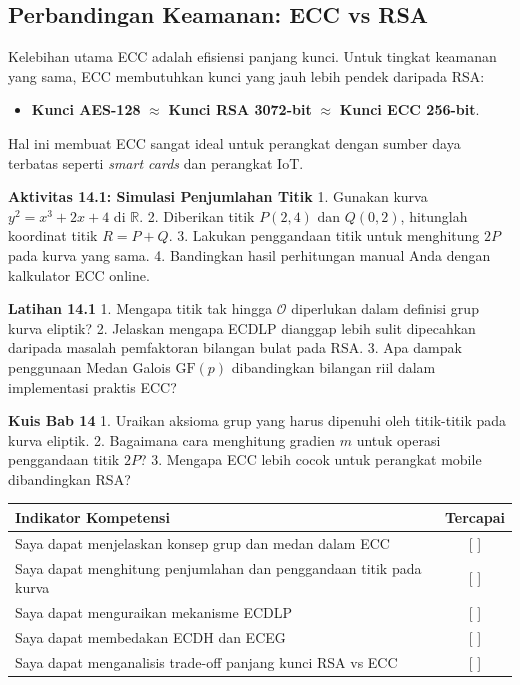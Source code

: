 \documentclass[../main.tex]{subfiles}
\begin{document}
\subsection{Perbandingan Keamanan: ECC vs RSA}
Kelebihan utama ECC adalah efisiensi panjang kunci. Untuk tingkat keamanan yang sama, ECC membutuhkan kunci yang jauh lebih pendek daripada RSA:
\begin{itemize}
    \item \textbf{Kunci AES-128} $\approx$ \textbf{Kunci RSA 3072-bit} $\approx$ \textbf{Kunci ECC 256-bit}.
\end{itemize}
Hal ini membuat ECC sangat ideal untuk perangkat dengan sumber daya terbatas seperti \textit{smart cards} dan perangkat IoT.

\begin{obeactivity}
\textbf{Aktivitas 14.1: Simulasi Penjumlahan Titik}
1. Gunakan kurva $y^2 = x^3 + 2x + 4$ di $\mathbb{R}$.
2. Diberikan titik $P(2, 4)$ dan $Q(0, 2)$, hitunglah koordinat titik $R = P + Q$.
3. Lakukan penggandaan titik untuk menghitung $2P$ pada kurva yang sama.
4. Bandingkan hasil perhitungan manual Anda dengan kalkulator ECC online.
\end{obeactivity}

\begin{obereflection}
\textbf{Latihan 14.1}
1. Mengapa titik tak hingga $\mathcal{O}$ diperlukan dalam definisi grup kurva eliptik?
2. Jelaskan mengapa ECDLP dianggap lebih sulit dipecahkan daripada masalah pemfaktoran bilangan bulat pada RSA.
3. Apa dampak penggunaan Medan Galois $\text{GF}(p)$ dibandingkan bilangan riil dalam implementasi praktis ECC?
\end{obereflection}

\begin{obeassessment}
\textbf{Kuis Bab 14}
1. Uraikan aksioma grup yang harus dipenuhi oleh titik-titik pada kurva eliptik.
2. Bagaimana cara menghitung gradien $m$ untuk operasi penggandaan titik $2P$?
3. Mengapa ECC lebih cocok untuk perangkat mobile dibandingkan RSA?
\end{obeassessment}

\begin{competencychecklist}
\begin{tabularx}{\linewidth}{|X|c|}
\hline
Indikator Kompetensi & Tercapai \\
\hline
Saya dapat menjelaskan konsep grup dan medan dalam ECC & [ ] \\
\hline
Saya dapat menghitung penjumlahan dan penggandaan titik pada kurva & [ ] \\
\hline
Saya dapat menguraikan mekanisme ECDLP & [ ] \\
\hline
Saya dapat membedakan ECDH dan ECEG & [ ] \\
\hline
Saya dapat menganalisis trade-off panjang kunci RSA vs ECC & [ ] \\
\hline
\end{tabularx}
\end{competencychecklist}
\end{document}
